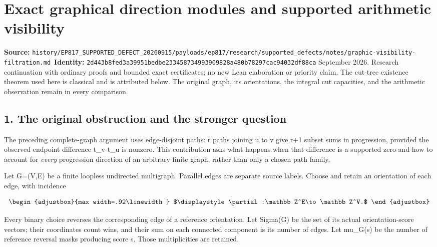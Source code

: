 \chapter{Exact graphical direction modules and supported arithmetic visibility}
\label{chapter:11_graphic-visibility-filtration}
{\small\noindent\textbf{Source:} \nolinkurl{history/EP817_SUPPORTED_DEFECT_20260915/payloads/ep817/research/supported_defects/notes/graphic-visibility-filtration.md}\
\textbf{Identity:} \nolinkurl{2d443b8fed3a39951bedbe233458734993909828a480b78297cac94032df88ca}}
 September 2026. Research continuation with ordinary proofs and bounded exact certificates; no new Lean elaboration or priority claim. The cut-tree existence theorem used here is classical and is attributed below. The original graph, its orientations, the integral cut capacities, and the arithmetic observation remain in every comparison.

\section{1. The original obstruction and the stronger question}\label{n11-the-original-obstruction-and-the-stronger-question}

The preceding complete-graph argument uses edge-disjoint paths: r paths joining u to v give r+1 subset sums in progression, provided the observed endpoint difference t\_v-t\_u is nonzero. This contribution asks what happens when that difference is a supported zero and how to account for \emph{every} progression direction of an arbitrary finite graph, rather than only a chosen path family.

Let G=(V,E) be a finite loopless undirected multigraph. Parallel edges are separate source labels. Choose and retain an orientation of each edge, with incidence

\[
\begin{adjustbox}{max width=.92\linewidth}
$\displaystyle \partial:\mathbb Z^E\to\mathbb Z^V.$
\end{adjustbox}
\]

Every binary choice reverses the corresponding edge of a reference orientation. Let Sigma(G) be the set of its actual orientation-score vectors; their coordinates count wins, and their sum on each connected component is its number of edges. Let mu\_G(s) be the number of reference reversal masks producing score s. Those multiplicities are retained.

